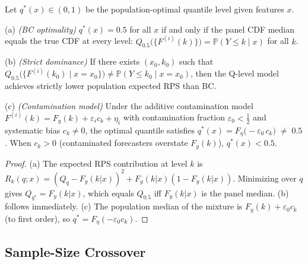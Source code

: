 \begin{theorem}
\label{thm:qlevel_dominance}
Let $q^*(x) \in (0,1)$ be the population-optimal quantile level given features $x$.

\noindent(a) \emph{(BC optimality)} $q^*(x) = 0.5$ for all $x$ if and only if
the panel CDF median equals the true CDF at every level:
$Q_{0.5}\bigl(\{F^{(i)}(k)\}\bigr) = \mathbb{P}(Y \leq k \mid x)$ for all $k$.

\noindent(b) \emph{(Strict dominance)} If there exists $(x_0, k_0)$ such that
$Q_{0.5}\bigl(\{F^{(i)}(k_0) \mid x = x_0\}\bigr)
    \neq \mathbb{P}(Y \leq k_0 \mid x = x_0)$,
then the Q-level model achieves strictly lower population expected RPS than BC.

\noindent(c) \emph{(Contamination model)} Under the additive contamination model
$F^{(i)}(k) = F_y(k) + \varepsilon_i c_k + \eta_i$
with contamination fraction $\varepsilon_0 < \frac{1}{2}$ and systematic bias $c_k \neq 0$,
the optimal quantile satisfies
$q^*(x) = F_\eta\!\bigl(-\varepsilon_0\,c_k\bigr) \;\neq\; 0.5$.
When $c_k > 0$ (contaminated forecasters overstate $F_y(k)$), $q^*(x) < 0.5$.
\end{theorem}

\begin{proof}
(a) The expected RPS contribution at level $k$ is
$R_k(q; x) = (Q_q - F_y(k|x))^2 + F_y(k|x)(1-F_y(k|x))$.
Minimizing over $q$ gives $Q_{q^*} = F_y(k|x)$, which equals $Q_{0.5}$ iff
$F_y(k|x)$ is the panel median.
(b) follows immediately.
(c) The population median of the mixture is $F_y(k) + \varepsilon_0 c_k$ (to first order),
so $q^* = F_\eta(-\varepsilon_0 c_k)$.
\end{proof}

\subsection*{Sample-Size Crossover}

